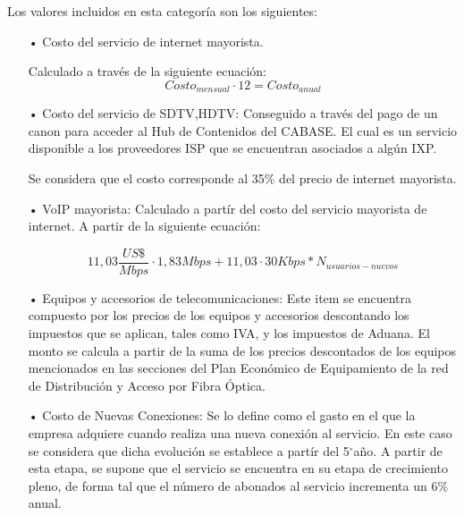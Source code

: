 \begin{enumerate}
Los valores incluidos en esta categoría son los siguientes:
\begin{enumerate}
\item[•]Costo del servicio de internet mayorista.

Calculado a través de la siguiente ecuación:
\begin{equation}
Costo_{mensual}\cdot 12 = Costo_{anual}
\end{equation}

\item[•]Costo del servicio de SDTV,HDTV: Conseguido a través del pago de un canon para acceder al Hub de Contenidos del CABASE.
El cual es un servicio disponible a los proveedores ISP que se encuentran asociados a algún IXP.

%

Se considera que el costo corresponde al 35\% del precio de internet mayorista.


\item[•]VoIP mayorista: Calculado a partír del costo del servicio mayorista de internet.
A partir de la siguiente ecuación:

\begin{equation}
11,03 \dfrac{US\$}{Mbps} \cdot 1,83 Mbps + 11,03 \cdot 30 Kbps * N_{usuarios-nuevos}
\end{equation}

\item[•]Equipos y accesorios de telecomunicaciones: Este item se encuentra compuesto por los precios de los equipos y accesorios 
descontando los impuestos que se aplican, tales como IVA, y los impuestos de Aduana. El monto se calcula a partir de la suma
de los precios descontados de los equipos mencionados en las secciones del Plan Económico de Equipamiento de la red de Distribución
y Acceso por Fibra Óptica.

\item[•]Costo de Nuevas Conexiones: Se lo define como el gasto en el que la empresa adquiere cuando realiza una nueva conexión al servicio.
En este caso se considera que dicha evolución se establece a partír del 5$^{\circ}$año.
A partir de esta etapa, se supone que el servicio se encuentra en su etapa de crecimiento pleno, de forma tal que el número de abonados al servicio incrementa un 6\% anual.


\end{enumerate}
\end{enumerate}
